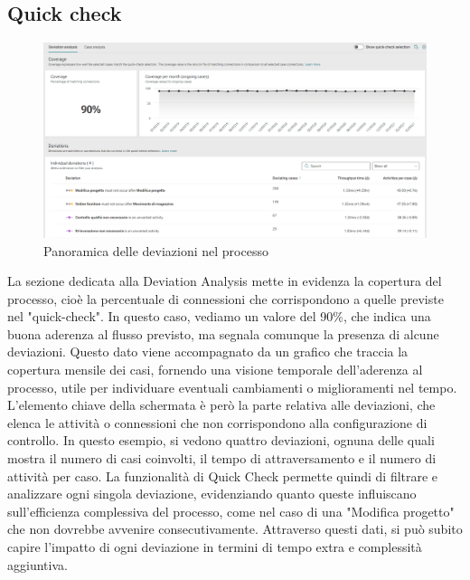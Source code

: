 \documentclass{article}
\begin{document}
\subsection{Quick check}
\begin{figure}[H]
    \centering
    \includegraphics[width=\textwidth]{imgARIS/Simulazione/QuickCheck1Simulazione.png}
    \caption{Panoramica delle deviazioni nel processo}
    \label{fig:quick-check-1}
\end{figure}
La sezione dedicata alla Deviation Analysis mette in evidenza la copertura del processo, cioè la percentuale di connessioni che corrispondono a quelle previste nel "quick-check". In questo caso, vediamo un valore del 90\%, che indica una buona aderenza al flusso previsto, ma segnala comunque la presenza di alcune deviazioni. Questo dato viene accompagnato da un grafico che traccia la copertura mensile dei casi, fornendo una visione temporale dell'aderenza al processo, utile per individuare eventuali cambiamenti o miglioramenti nel tempo.\\
L'elemento chiave della schermata è però la parte relativa alle deviazioni, che elenca le attività o connessioni che non corrispondono alla configurazione di controllo. In questo esempio, si vedono quattro deviazioni, ognuna delle quali mostra il numero di casi coinvolti, il tempo di attraversamento e il numero di attività per caso. La funzionalità di Quick Check permette quindi di filtrare e analizzare ogni singola deviazione, evidenziando quanto queste influiscano sull'efficienza complessiva del processo, come nel caso di una "Modifica progetto" che non dovrebbe avvenire consecutivamente. Attraverso questi dati, si può subito capire l'impatto di ogni deviazione in termini di tempo extra e complessità aggiuntiva.\\
\end{document}
